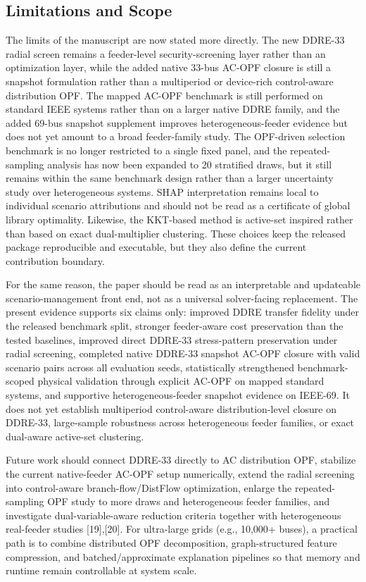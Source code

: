 \documentclass[journal]{IEEEtran}
\begin{document}
\subsection{Limitations and Scope}
The limits of the manuscript are now stated more directly. The new DDRE-33 radial screen remains a feeder-level security-screening layer rather than an optimization layer, while the added native 33-bus AC-OPF closure is still a snapshot formulation rather than a multiperiod or device-rich control-aware distribution OPF. The mapped AC-OPF benchmark is still performed on standard IEEE systems rather than on a larger native DDRE family, and the added 69-bus snapshot supplement improves heterogeneous-feeder evidence but does not yet amount to a broad feeder-family study. The OPF-driven selection benchmark is no longer restricted to a single fixed panel, and the repeated-sampling analysis has now been expanded to 20 stratified draws, but it still remains within the same benchmark design rather than a larger uncertainty study over heterogeneous systems. SHAP interpretation remains local to individual scenario attributions and should not be read as a certificate of global library optimality. Likewise, the KKT-based method is active-set inspired rather than based on exact dual-multiplier clustering. These choices keep the released package reproducible and executable, but they also define the current contribution boundary.

For the same reason, the paper should be read as an interpretable and updateable scenario-management front end, not as a universal solver-facing replacement. The present evidence supports six claims only: improved DDRE transfer fidelity under the released benchmark split, stronger feeder-aware cost preservation than the tested baselines, improved direct DDRE-33 stress-pattern preservation under radial screening, completed native DDRE-33 snapshot AC-OPF closure with valid scenario pairs across all evaluation seeds, statistically strengthened benchmark-scoped physical validation through explicit AC-OPF on mapped standard systems, and supportive heterogeneous-feeder snapshot evidence on IEEE-69. It does not yet establish multiperiod control-aware distribution-level closure on DDRE-33, large-sample robustness across heterogeneous feeder families, or exact dual-aware active-set clustering.

Future work should connect DDRE-33 directly to AC distribution OPF, stabilize the current native-feeder AC-OPF setup numerically, extend the radial screening into control-aware branch-flow/DistFlow optimization, enlarge the repeated-sampling OPF study to more draws and heterogeneous feeder families, and investigate dual-variable-aware reduction criteria together with heterogeneous real-feeder studies [19],[20]. For ultra-large grids (e.g., 10,000+ buses), a practical path is to combine distributed OPF decomposition, graph-structured feature compression, and batched/approximate explanation pipelines so that memory and runtime remain controllable at system scale.
\end{document}
